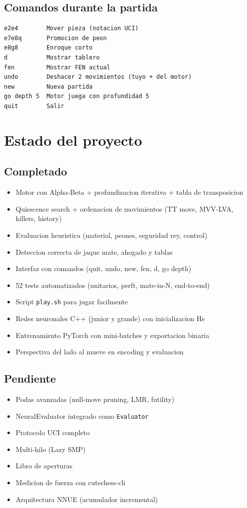 \documentclass[11pt,a4paper]{article}
\begin{document}
\subsection*{Comandos durante la partida}
\begin{verbatim}
e2e4        Mover pieza (notacion UCI)
e7e8q       Promocion de peon
e8g8        Enroque corto
d           Mostrar tablero
fen         Mostrar FEN actual
undo        Deshacer 2 movimientos (tuyo + del motor)
new         Nueva partida
go depth 5  Motor juega con profundidad 5
quit        Salir
\end{verbatim}

\section{Estado del proyecto}

\subsection*{Completado}
\begin{itemize}
  \item Motor con Alpha-Beta + profundizacion iterativa + tabla de transposicion
  \item Quiescence search + ordenacion de movimientos (TT move, MVV-LVA, killers, history)
  \item Evaluacion heuristica (material, peones, seguridad rey, control)
  \item Deteccion correcta de jaque mate, ahogado y tablas
  \item Interfaz con comandos (quit, undo, new, fen, d, go depth)
  \item 52 tests automatizados (unitarios, perft, mate-in-N, end-to-end)
  \item Script \texttt{play.sh} para jugar facilmente
  \item Redes neuronales C++ (junior y grande) con inicializacion He
  \item Entrenamiento PyTorch con mini-batches y exportacion binaria
  \item Perspectiva del lado al mueve en encoding y evaluacion
\end{itemize}

\subsection*{Pendiente}
\begin{itemize}
  \item Podas avanzadas (null-move pruning, LMR, futility)
  \item NeuralEvaluator integrado como \texttt{Evaluator}
  \item Protocolo UCI completo
  \item Multi-hilo (Lazy SMP)
  \item Libro de aperturas
  \item Medicion de fuerza con cutechess-cli
  \item Arquitectura NNUE (acumulador incremental)
\end{itemize}
\end{document}
